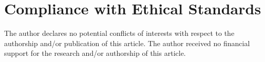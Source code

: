 \documentclass{article}                     %
\begin{document}
\section{Compliance with Ethical Standards}
The author declares no potential conflicts of interests with respect to the authorship and/or publication of this article. The author received no financial support for the research and/or authorship of this article.
\printbibliography


%
%
%
%
%
%
%
%
\end{document}
